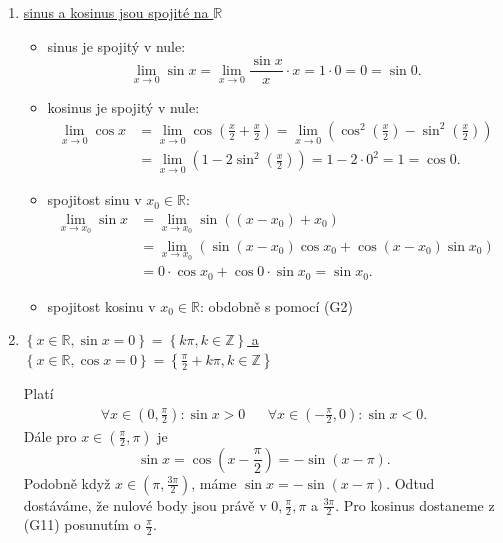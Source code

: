\begin{enumerate}
	\par $\cos(x+2\pi)=\cos x$ analogicky.
	\item[(G13)] \underline{sinus a kosinus jsou spojité na $\mathbb R $}
	\begin{itemize}
		\item sinus je spojitý v nule:
		$$
  \lim_{x \to 0} \sin x = \lim_{x\to 0} \frac{\sin x}{x}\cdot x = 1\cdot 0 = 0 = \sin 0.
		$$
		\item kosinus je spojitý v nule:
		\begin{align*}
		\lim_{x\to 0} \cos x & = \lim_{x\to 0} \cos \left( \frac{x}{2}+\frac{x}{2} \right ) = \lim_{x\to 0} \left( \cos^2 \left( \frac{x}{2} \right ) - \sin^2 \left( \frac{x}{2} \right ) \right) \\
	&= \lim_{x\to 0} \left( 1-2\sin^2 \left( \frac{x}{2} \right ) \right ) = 1-2\cdot 0^2 = 1 = \cos 0.
\end{align*}
		\item spojitost sinu v $x_0\in \mathbb R $:
		\begin{align*}
		\lim_{x\to x_0} \sin x & = \lim_{x\to x_0} \sin \left( \left( x-x_0 \right ) +x_0 \right )\\
	& = \lim_{x\to x_0} \left( \sin(x-x_0)\cos x_0 + \cos (x-x_0)\sin x_0  \right )\\
	& = 0 \cdot \cos x_0 + \cos 0 \cdot \sin x_0 = \sin x_0.
\end{align*}
		\item spojitost kosinu v $x_0 \in \mathbb R $: obdobně s pomocí (G2)
	\end{itemize}
	\item[(G14)] \underline{$\left \{ x\in \mathbb R , \sin x = 0 \right \} = \left \{ k\pi, k \in \mathbb Z  \right \}  $ a $\left \{ x\in \mathbb R , \cos x = 0 \right \} = \left \{ \frac{\pi}{2}+k\pi, k \in \mathbb Z  \right \}  $}
	\par Platí
	\begin{align*}
		\forall x \in \left( 0, \frac{\pi}{2} \right ) : \sin x  > 0 &&  \forall x \in \left( -\frac{\pi}{2}, 0 \right ) :\sin x < 0.
	\end{align*}
	Dále pro $x \in \left( \frac{\pi}{2},\pi \right ) $ je
	$$
	    \sin x = \cos \left( x-\frac{\pi}{2} \right ) = - \sin (x-\pi).
	$$
	Podobně když $x\in \left( \pi, \frac{3\pi}{2} \right ) $, máme $\sin x = - \sin (x-\pi)$.
	Odtud dostáváme, že nulové body jsou právě v $0, \frac{\pi}{2}, \pi$ a $\frac{3\pi}{2}$.
	Pro kosinus dostaneme z (G11) posunutím o $\frac{\pi}{2}$.
\end{enumerate}

